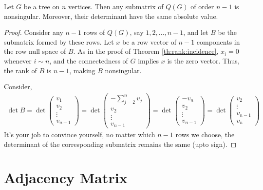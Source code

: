 \documentclass[../basic_graph_theory.tex]{subfiles}
\begin{document}
\begin{Thm}{}{}
  Let \(G\) be a tree on \(n\) vertices. Then any submatrix of \(Q(G)\) of order \(n - 1\) is nonsingular. Moreover, their determinant have the same absolute value.
\end{Thm}
\begin{proof}
  Consider any \(n - 1\) rows of \(Q(G)\), say \(1, 2, \dots, n - 1\), and let \(B\) be the submatrix formed by these rows. Let \(x\) be a row vector of \(n - 1\) components in the row null space of \(B\). As in the proof of Theorem \ref{th:rank:incidence}, \(x_i = 0\) whenever \(i \sim n\), and the connectedness of \(G\) implies \(x\) is the zero vector. Thus, the rank of \(B\) is \(n - 1\), making \(B\) nonsingular.

  \ssk

  Consider,
  \begin{align*}
    \det B = \det \begin{pmatrix}
                    v_1 \\ v_2 \\ \vdots \\ v_{n-1}
                  \end{pmatrix}
    = \det \begin{pmatrix}
             -\sum_{j = 2}^{n} v_j \\ v_2 \\ \vdots \\ v_{n-1}
           \end{pmatrix}
    = \det \begin{pmatrix}
             -v_n \\ v_2 \\ \vdots \\ v_{n-1}
           \end{pmatrix}
    = \det \begin{pmatrix}
             v_2 \\ \vdots \\ v_{n-1} \\ v_n
           \end{pmatrix}
  \end{align*}
  It's your job to convince yourself, no matter which \(n - 1\) rows we choose, the determinant of the corresponding submatrix remains the same (upto sign).
\end{proof}

\section{Adjacency Matrix}
\end{document}
